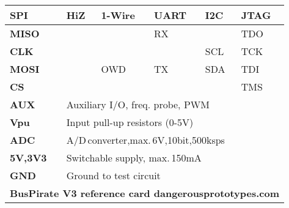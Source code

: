 \documentclass[10pt]{article}
\begin{document}



\newcommand{\coltext}[1]{{\textbf{\color{#1}#1}}}

\renewcommand{\arraystretch}{.9}
\setlength{\tabcolsep}{2pt}

\thispagestyle{empty} %
\sffamily{}\scriptsize
\begin{tabular}{|l|l|l|l|l|l|}
  \hline
    \textbf{SPI}  & \textbf{HiZ} & \textbf{1-Wire} & \textbf{UART} & \textbf{I2C} & \textbf{JTAG}\\ \hline
    \coltext{MISO} & &     & RX &     & TDO \\ \hline
    \coltext{CLK}  & &     &    & SCL & TCK \\ \hline
    \coltext{MOSI} & & OWD & TX & SDA & TDI \\ \hline
    \coltext{CS}   & &     &    &     & TMS \\ \hline
  \hline
    \coltext{AUX} & \multicolumn{5}{|l|}{Auxiliary I/O, freq. probe, PWM} \\ \hline
    \coltext{Vpu} & \multicolumn{5}{|l|}{Input pull-up resistors (0-5V)} \\ \hline
    \coltext{ADC} & \multicolumn{5}{|l|}{A/D\,converter,max.\,6V,10bit,500ksps}\\ \hline
    \textbf{{\color{V5}5V},{\color{V33}3V3}} & \multicolumn{5}{|l|}{Switchable supply, max.\,150mA}\\ \hline
    \coltext{GND} & \multicolumn{5}{|l|}{Ground to test circuit}\\ \hline
  \hline
    \multicolumn{6}{|c|}{\textbf{\tiny BusPirate V3 reference card \hfill dangerousprototypes.com}}\\ 
  \hline
\end{tabular}
\end{document}
